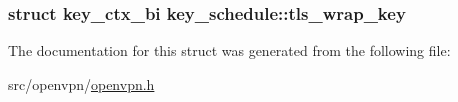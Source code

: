 \subsubsection[{tls\+\_\+wrap\+\_\+key}]{\setlength{\rightskip}{0pt plus 5cm}struct {\bf key\+\_\+ctx\+\_\+bi} key\+\_\+schedule\+::tls\+\_\+wrap\+\_\+key}\label{structkey__schedule_ad2ce1d97a35d1c487ce7c13f52d900c5}


The documentation for this struct was generated from the following file\+:\begin{DoxyCompactItemize}
\item 
src/openvpn/\hyperlink{openvpn_8h}{openvpn.\+h}\end{DoxyCompactItemize}
